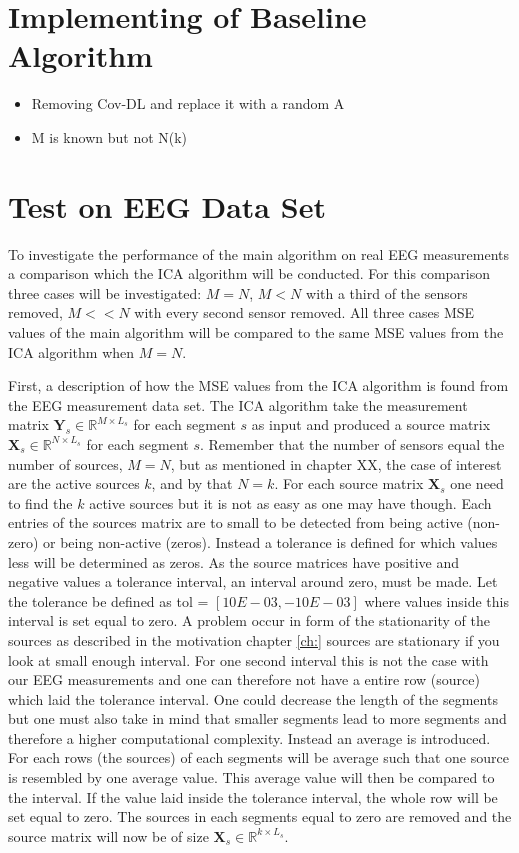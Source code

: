 \section{Implementing of Baseline Algorithm}
\begin{itemize}
\item Removing Cov-DL and replace it with a random A
\item M is known but not N(k)
\end{itemize}

\section{Test on EEG Data Set}
To investigate the performance of the main algorithm on real EEG measurements a comparison which the ICA algorithm will be conducted. For this comparison three cases will be investigated: $M = N$, $M < N$ with a third of the sensors removed, $M << N$ with every second sensor removed. All three cases MSE values of the main algorithm will be compared to the same MSE values from the ICA algorithm when $M=N$.

First, a description of how the MSE values from the ICA algorithm is found from the EEG measurement data set.
The ICA algorithm take the measurement matrix $\mathbf{Y}_s \in \mathbb{R}^{M \times L_s}$ for each segment $s$ as input and produced a source matrix $\mathbf{X}_s \in \mathbb{R}^{N \times L_s}$ for each segment $s$. Remember that the number of sensors equal the number of sources, $M = N$, but as mentioned in chapter XX, the case of interest are the active sources $k$, and by that $N = k$. 
For each source matrix $\mathbf{X}_s$ one need to find the $k$ active sources but it is not as easy as one may have though. Each entries of the sources matrix are to small to be detected from being active (non-zero) or being non-active (zeros).
Instead a tolerance is defined for which values less will be determined as zeros. As the source matrices have positive and negative values a tolerance interval, an interval around zero, must be made. Let the tolerance be defined as tol = $[10E-03, -10E-03]$ where values inside this interval is set equal to zero.
A problem occur in form of the stationarity of the sources as described in the motivation chapter \ref{ch:} sources are stationary if you look at small enough interval. For one second interval this is not the case with our EEG measurements and one can therefore not have a entire row (source) which laid the tolerance interval. One could decrease the length of the segments but one must also take in mind that smaller segments lead to more segments and therefore a higher computational complexity. Instead an average is introduced. For each rows (the sources) of each segments will be average such that one source is resembled by one average value. This average value will then be compared to the interval. If the value laid inside the tolerance interval, the whole row will be set equal to zero. The sources in each segments equal to zero are removed and the source matrix will now be of size $\mathbf{X}_s \in \mathbb{R}^{k \times L_s}$.

